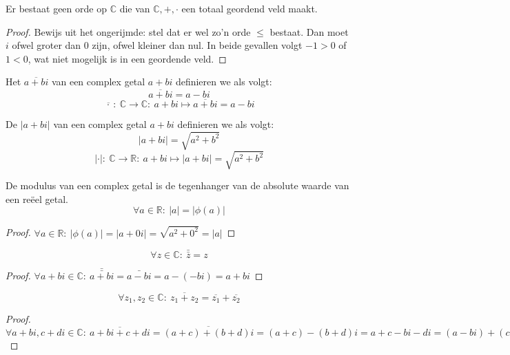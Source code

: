 \documentclass[main.tex]{subfiles}
\begin{document}
\begin{pr}
  Er bestaat geen orde op $\mathbb{C}$ die van $\mathbb{C},+,\cdot$ een totaal geordend veld maakt.

  \begin{proof}
    Bewijs uit het ongerijmde: stel dat er wel zo'n orde $\le$ bestaat.
    Dan moet $i$ ofwel groter dan $0$ zijn, ofwel kleiner dan nul.
    In beide gevallen volgt $-1 > 0$ of $1 < 0$, wat niet mogelijk is in een geordende veld.
  \end{proof}
\end{pr}

\begin{de}
  Het  $\overline{a+bi}$ van een complex getal $a+bi$ definieren we als volgt:
  \[ \overline{a+bi} = a-bi \]
  \[ \overline{\, \cdot\ }:\ \mathbb{C} \rightarrow \mathbb{C}:\ a+bi \mapsto \overline{a+bi} = a-bi \]
\end{de}

\begin{de}
  De  $|a+bi|$ van een complex getal $a+bi$ definieren we als volgt:
  \[ |a+bi| = \sqrt{a^{2}+b^{2}} \]
  \[ |\cdot|:\ \mathbb{C} \rightarrow \mathbb{R}:\ a+bi \mapsto |a+bi| = \sqrt{a^{2}+b^{2}} \]
\end{de}

\begin{ei}
  De modulus van een complex getal is de tegenhanger van de absolute waarde van een re\"eel getal.
  \[ \forall a \in \mathbb{R}:\ |a| = |\phi(a)| \]
  \begin{proof}
    $\forall a\in \mathbb{R}:\ |\phi(a)| = |a+0i| = \sqrt{a^{2} + 0^{2}} = |a|$
  \end{proof}
\end{ei}

\begin{pr}
  \[ \forall z\in \mathbb{C}:\ \bar{\bar{z}} = z \]

  \begin{proof}
    $\forall a+bi\in \mathbb{C}:\ \bar{\bar{a+bi}} = \bar{a-bi} = a-(-bi) = a+bi$
  \end{proof}
\end{pr}

\begin{pr}
  \[ \forall z_{1},z_{2}\in \mathbb{C}:\ \overline{z_{1}+z_{2}} = \overline{z_{1}} + \overline{z_{2}} \]

  \begin{proof}
    $\forall a+bi,c+di \in \mathbb{C}:\ \overline{a+bi + c+di} = \overline{(a+c)+(b+d)i} =(a+c)-(b+d)i = a+c-bi-di = (a-bi) + (c-di)$
  \end{proof}
\end{pr}
\end{document}

